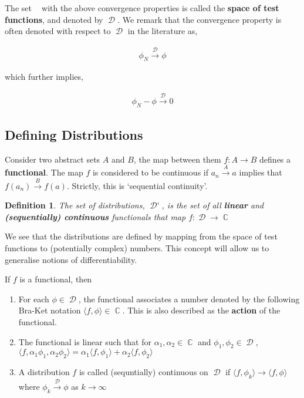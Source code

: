 \documentclass[12pt, a4]{article}
\newtheorem{definition}{Definition}[section]
\DeclareMathOperator\complexes{\mathbb{C}}
\DeclareMathOperator\tfspace{C_0^\infty}
\DeclareMathOperator\tfspaceD{\mathcal{D}}
\DeclareMathOperator\dist{\mathcal{D'}}
\begin{document}
The set $\tfspace$ with the above convergence properties is called the \textbf{space of test functions}, and denoted by $\tfspaceD$. We remark that the convergence property is often denoted with respect to $\tfspaceD$ in the literature as,

\begin{eqnarray}
    \phi_N \overset{\tfspaceD}{\rightarrow} \phi
\end{eqnarray}

which further implies,

\begin{eqnarray}
    \phi_N - \phi \overset{\tfspaceD}{\rightarrow} 0
\end{eqnarray}

\subsection{Defining Distributions}

Consider two abstract sets $A$ and $B$, the map between them $f : A \rightarrow B$ defines a \textbf{functional}. The map $f$ is considered to be continuous if $a_n \overset{A}{\rightarrow} a$ implies that $f(a_n) \overset{B}{\rightarrow} f(a)$. Strictly, this is `sequential continuity'.

\begin{definition}
    The set of distributions, $\dist$, is the set of all \textbf{linear} and \textbf{ (sequentially) continuous} functionals that map $f : \tfspaceD \rightarrow \complexes$
\label{def:distribution}
\end{definition}

We see that the distributions are defined by mapping from the space of test functions to (potentially complex) numbers. This concept will allow us to generalise notions of differentiability.

If $f$ is a functional, then

\begin{enumerate}
    \item For each $\phi \in \tfspaceD$, the functional associates a number denoted by the following Bra-Ket notation $\langle f, \phi \rangle \in \complexes$. This is also described as the \textbf{action} of the functional.
    \item The functional is linear such that for $\alpha_1, \alpha_2 \in \complexes$ and $\phi_1, \phi_2 \in \tfspaceD$, $\langle f, \alpha_1\phi_1, \alpha_2\phi_2 \rangle = \alpha_1\langle f, \phi_1 \rangle + \alpha_2\langle f, \phi_2 \rangle $
    \item A distribution $f$ is called (sequntially) continuous on $\tfspaceD$ if $\langle f, \phi_k \rangle \rightarrow \langle f, \phi \rangle$ where $\phi_k \overset{\tfspaceD}{\rightarrow} \phi$ as $k \rightarrow \infty$
\end{enumerate}
\end{document}
